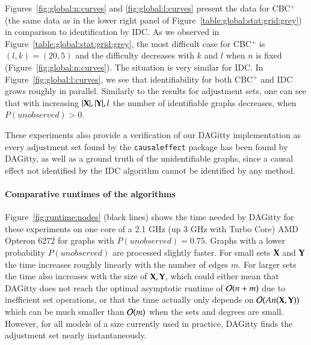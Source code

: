 Figures~\ref{fig:global:n:curves} and \ref{fig:global:l:curves} present the data for CBC$^+$
(the same data as in the lower right panel of Figure~\ref{table:global:stat:grid:grey}) in
comparison to identification by IDC. 
%
%
%
%
%
%
%
%
As we observed in Figure~\ref{table:global:stat:grid:grey}, the most difficult case for CBC$^+$
is $(l,k)=(20,5)$ and the difficulty decreases with $k$ and $l$ when $n$ is fixed
(Figure~\ref{fig:global:n:curves}). The situation is very similar for IDC.
In Figure~\ref{fig:global:l:curves}, we see that identifiability for both 
CBC$^+$ and IDC grows roughly in parallel. Similarly to the results for adjustment sets, one can see that with increasing $|{\bf X}|, |{\bf Y}|, l$ the number of identifiable graphs decreases, when $ P(\textit{unobserved}) > 0 $. %


These experiments also provide a verification of our DAGitty implementation as every adjustment set found by the {\tt causaleffect} package has been found by DAGitty, as well as a ground truth of the unidentifiable graphs, since a causal effect not identified by the IDC algorithm cannot be identified by any method.




\paragraph{Comparative runtimes of the algorithms}
Figure~\ref{fig:runtime:nodes} (black lines) shows the time needed by DAGitty for these experiments on one core of a 2.1 GHz (up 3 GHz with Turbo Core) AMD Opteron 6272 for graphs with $P(\textit{unobserved}) = 0.75$. Graphs with a lower probability $P(\textit{unobserved})$ are processed slightly faster.  For small sets ${\bf X}$ and ${\bf Y}$ the time increases roughly linearly with the number of edges $m$. For larger sets the time also increases with the size of ${\bf X},{\bf Y}$, which could either mean that DAGitty does not reach the optimal asymptotic runtime of ${\cal O}(n+m)$ due to inefficient set operations, or that the time actually only depends on ${\cal O}(\textit{An}({\bf X}, {\bf Y}))$ which can be much smaller than ${\cal O}(m)$ when the sets and degrees are small. However, for all models of a size currently used in practice, DAGitty finds the adjustment set nearly instantaneously. 

